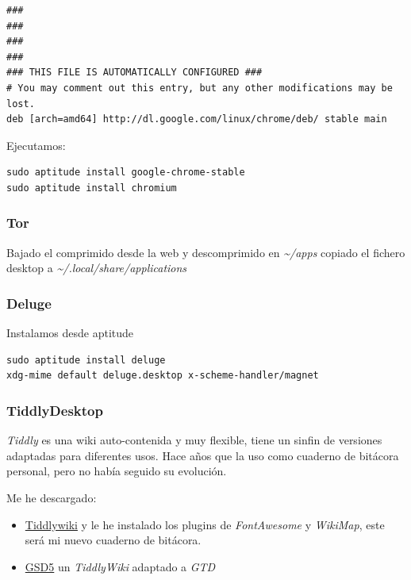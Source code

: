 \documentclass[12pt,spanish,]{article}
\providecommand{\tightlist}{%
  \setlength{\itemsep}{0pt}\setlength{\parskip}{0pt}}
\begin{document}
\begin{verbatim}
###
###
###
###
### THIS FILE IS AUTOMATICALLY CONFIGURED ###
# You may comment out this entry, but any other modifications may be lost.
deb [arch=amd64] http://dl.google.com/linux/chrome/deb/ stable main
\end{verbatim}

Ejecutamos:

\begin{verbatim}
sudo aptitude install google-chrome-stable
sudo aptitude install chromium
\end{verbatim}

\subsubsection{Tor}\label{tor}

Bajado el comprimido desde la web y descomprimido en
\emph{\textasciitilde{}/apps} copiado el fichero desktop a
\emph{\textasciitilde{}/.local/share/applications}

\subsubsection{Deluge}\label{deluge}

Instalamos desde aptitude

\begin{verbatim}
sudo aptitude install deluge
xdg-mime default deluge.desktop x-scheme-handler/magnet
\end{verbatim}

\subsubsection{TiddlyDesktop}\label{tiddlydesktop}

\emph{Tiddly} es una wiki auto-contenida y muy flexible, tiene un sinfin
de versiones adaptadas para diferentes usos. Hace años que la uso como
cuaderno de bitácora personal, pero no había seguido su evolución.

Me he descargado:

\begin{itemize}
\tightlist
\item
  \href{http://tiddlywiki.com/}{Tiddlywiki} y le he instalado los
  plugins de \emph{FontAwesome} y \emph{WikiMap}, este será mi nuevo
  cuaderno de bitácora.
\item
  \href{http://gsd5.tiddlyspot.com/}{GSD5} un \emph{TiddlyWiki} adaptado
  a \emph{GTD}
\end{itemize}
\end{document}

